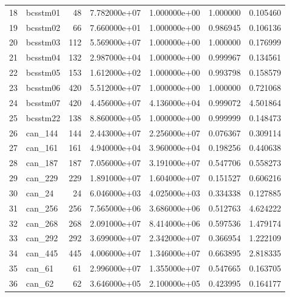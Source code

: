 \begin{tabular}{llrrrrr}
18  &                 bcsstm01 &    48 &  7.782000e+07 &  1.000000e+00 &  1.000000 &   0.105460 \\
19  &                 bcsstm02 &    66 &  7.660000e+01 &  1.000000e+00 &  0.986945 &   0.106136 \\
20  &                 bcsstm03 &   112 &  5.569000e+07 &  1.000000e+00 &  1.000000 &   0.176999 \\
21  &                 bcsstm04 &   132 &  2.987000e+04 &  1.000000e+00 &  0.999967 &   0.134561 \\
22  &                 bcsstm05 &   153 &  1.612000e+02 &  1.000000e+00 &  0.993798 &   0.158579 \\
23  &                 bcsstm06 &   420 &  5.512000e+07 &  1.000000e+00 &  1.000000 &   0.721068 \\
24  &                 bcsstm07 &   420 &  4.456000e+07 &  4.136000e+04 &  0.999072 &   4.501864 \\
25  &                 bcsstm22 &   138 &  8.860000e+05 &  1.000000e+00 &  0.999999 &   0.148473 \\
26  &                  can\_144 &   144 &  2.443000e+07 &  2.256000e+07 &  0.076367 &   0.309114 \\
27  &                  can\_161 &   161 &  4.940000e+04 &  3.960000e+04 &  0.198256 &   0.440638 \\
28  &                  can\_187 &   187 &  7.056000e+07 &  3.191000e+07 &  0.547706 &   0.558273 \\
29  &                  can\_229 &   229 &  1.891000e+07 &  1.604000e+07 &  0.151527 &   0.606216 \\
30  &                   can\_24 &    24 &  6.046000e+03 &  4.025000e+03 &  0.334338 &   0.127885 \\
31  &                  can\_256 &   256 &  7.565000e+06 &  3.686000e+06 &  0.512763 &   4.624222 \\
32  &                  can\_268 &   268 &  2.091000e+07 &  8.414000e+06 &  0.597536 &   1.479174 \\
33  &                  can\_292 &   292 &  3.699000e+07 &  2.342000e+07 &  0.366954 &   1.222109 \\
34  &                  can\_445 &   445 &  4.006000e+07 &  1.346000e+07 &  0.663895 &   2.818335 \\
35  &                   can\_61 &    61 &  2.996000e+07 &  1.355000e+07 &  0.547665 &   0.163705 \\
36  &                   can\_62 &    62 &  3.646000e+05 &  2.100000e+05 &  0.423995 &   0.164177 \\

\end{tabular}
